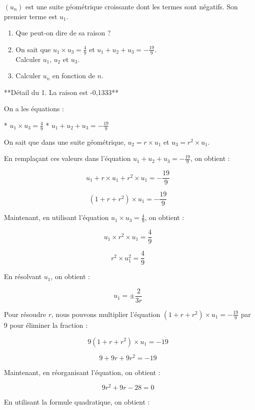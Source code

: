 \documentclass[11pt]{article}
\begin{document}
\begin{exercice}[3][Problème]
\( (u_n) \) est une suite géométrique croissante dont les termes sont négatifs. Son premier terme est \( u_1 \).
    \begin{enumerate}
        \item Que peut-on dire de sa raison ?
        \item On sait que \( u_1 \times u_3 = \frac{4}{9} \) et \( u_1
        + u_2 + u_3 = -\frac{19}{9} \). \\
        Calculer \( u_1 \), \( u_2 \) et \( u_3 \).
        \item Calculer \( u_n \) en fonction de \( n \).
        \end{enumerate}
\end{exercice}

\newpage

**Détail du 1. La raison est -0,1333**

On a les équations :

*   \( u_1 \times u_3 = \frac{4}{9} \)
*   \( u_1 + u_2 + u_3 = -\frac{19}{9} \)

On sait que dans une suite géométrique, \( u_2 = r \times u_1 \) et \( u_3 = r^2 \times u_1 \).

En remplaçant ces valeurs dans l'équation \( u_1 + u_2 + u_3 = -\frac{19}{9} \), on obtient :

\[ u_1 + r \times u_1 + r^2 \times u_1 = -\frac{19}{9} \]

\[ (1 + r + r^2) \times u_1 = -\frac{19}{9} \]

Maintenant, en utilisant l'équation \( u_1 \times u_3 = \frac{4}{9} \), on obtient :

\[ u_1 \times r^2 \times u_1 = \frac{4}{9} \]

\[ r^2 \times u_1^2 = \frac{4}{9} \]

En résolvant \( u_1 \), on obtient :

\[ u_1 = \pm \frac{2}{3r} \]

Pour résoudre \( r \), nous pouvons multiplier l'équation \( (1 + r + r^2) \times u_1 = -\frac{19}{9} \) par 9 pour éliminer la fraction :

\[ 9(1 + r + r^2) \times u_1 = -19 \]

\[ 9 + 9r + 9r^2 = -19 \]

Maintenant, en réorganisant l'équation, on obtient :

\[ 9r^2 + 9r - 28 = 0 \]

En utilisant la formule quadratique, on obtient :
\end{document}
